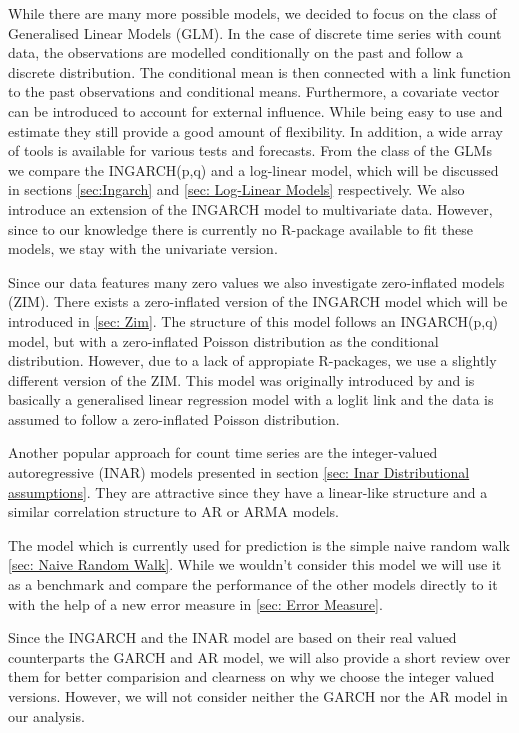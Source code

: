 While there are many more possible models, we decided to focus on the class of Generalised Linear Models (GLM). In the case of discrete time series with count data, the observations are modelled conditionally on the past and follow a discrete distribution. The conditional mean is then connected with a link function to the past observations and conditional means. Furthermore, a covariate vector can be introduced to account for external influence. While being easy to use and estimate they still provide a good amount of flexibility. In addition, a wide array of tools is available for various tests and forecasts. From the class of the GLMs we compare the INGARCH(p,q) and a log-linear model, which will be discussed in sections \ref{sec:Ingarch} and \ref{sec: Log-Linear Models} respectively. We also introduce an extension of the INGARCH model to multivariate data. However, since to our knowledge there is currently no R-package available to fit these models, we stay with the univariate version. 

Since our data features many zero values we also investigate zero-inflated models (ZIM). There exists a zero-inflated version of the INGARCH model which will be introduced in \ref{sec: Zim}. The structure of this model follows an INGARCH(p,q) model, but with a zero-inflated Poisson distribution as the conditional distribution. However, due to a lack of appropiate R-packages, we use a slightly different version of the ZIM. This model was originally introduced by \cite{Lambert:1992} and is basically a generalised linear regression model with a loglit link and the data is assumed to follow a zero-inflated Poisson distribution.

Another popular approach for count time series are the integer-valued autoregressive (INAR) models presented in section \ref{sec: Inar Distributional assumptions}. They are attractive since they have a linear-like structure and a similar correlation structure to AR or ARMA models. 

The model which is currently used for prediction is the simple naive random walk \ref{sec: Naive Random Walk}. While we wouldn't consider this model we will use it as a benchmark and compare the performance of the other models directly to it with the help of a new error measure in \ref{sec: Error Measure}. 

Since the INGARCH and the INAR model are based on their real valued counterparts the GARCH and AR model, we will also provide a short review over them for better comparision and clearness on why we choose the integer valued versions. However, we will not consider neither the GARCH nor the AR model in our analysis. 

